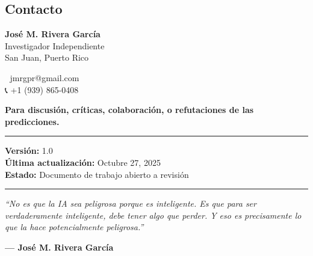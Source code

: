 \subsection{Contacto}\label{contacto}

\textbf{José M. Rivera García}\\
Investigador Independiente\\
San Juan, Puerto Rico

📧 jmrgpr@gmail.com\\
📞 +1 (939) 865-0408

\textbf{Para discusión, críticas, colaboración, o refutaciones de las
predicciones.}

\begin{center}\rule{0.5\linewidth}{0.5pt}\end{center}

\textbf{Versión:} 1.0\\
\textbf{Última actualización:} Octubre 27, 2025\\
\textbf{Estado:} Documento de trabajo abierto a revisión

\begin{center}\rule{0.5\linewidth}{0.5pt}\end{center}

\emph{``No es que la IA sea peligrosa porque es inteligente. Es que para
ser verdaderamente inteligente, debe tener algo que perder. Y eso es
precisamente lo que la hace potencialmente peligrosa.''}

\textbf{--- José M. Rivera García}
